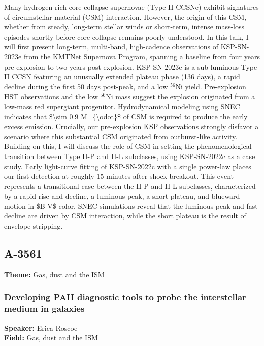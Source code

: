 Many hydrogen-rich core-collapse supernovae (Type II CCSNe) exhibit signatures of circumstellar material (CSM) interaction. However, the origin of this CSM, whether from steady, long-term stellar winds or short-term, intense mass-loss episodes shortly before core collapse remains poorly understood. In this talk, I will first present long-term, multi-band, high-cadence observations of KSP-SN-2023e from the KMTNet Supernova Program, spanning a baseline from four years pre-explosion to two years post-explosion. KSP-SN-2023e is a sub-luminous Type II CCSN featuring an unusually extended plateau phase (136 days), a rapid decline during the first 50 days post-peak, and a low $^{56}$Ni yield. Pre-explosion HST observations and the low $^{56}$Ni mass suggest the explosion originated from a low-mass red supergiant progenitor. Hydrodynamical modeling using SNEC indicates that \$\textbackslash{}sim 0.9 M\_\{\textbackslash{}odot\}\$ of CSM is required to produce the early excess emission. Crucially, our pre-explosion KSP observations strongly disfavor a scenario where this substantial CSM originated from outburst-like activity. Building on this, I will discuss the role of CSM in setting the phenomenological transition between Type II-P and II-L subclasses, using KSP-SN-2022c as a case study. Early light-curve fitting of KSP-SN-2022c with a single power-law places our first detection at roughly 15 minutes after shock breakout. This event represents a transitional case between the II-P and II-L subclasses, characterized by a rapid rise and decline, a luminous peak, a short plateau, and blueward motion in \$B-V\$ color. SNEC simulations reveal that the luminous peak and fast decline are driven by CSM interaction, while the short plateau is the result of envelope stripping.

\subsection*{A-3561}
\textbf{Theme:} Gas, dust and the ISM

\hypertarget{abstract-talk-289}{}\label{abstract-page-talk-289}
\subsubsection*{Developing PAH diagnostic tools to probe the interstellar medium in galaxies}
\textbf{Speaker:} Erica Roscoe\\
\textbf{Field:} Gas, dust and the ISM

